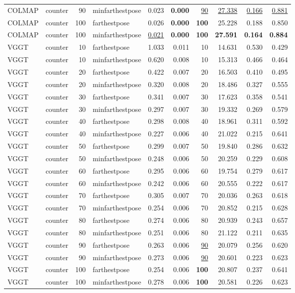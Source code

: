 \begin{table}[H]
\begin{tabular}{llrlrrrrrr}
COLMAP & counter & 90 & minfarthestpose & 0.023 & \textbf{0.000} & \underline{90} & \underline{27.338} & \underline{0.166} & \underline{0.881} \\
COLMAP & counter & 100 & farthestpose & 0.026 & \textbf{0.000} & \textbf{100} & 25.228 & 0.188 & 0.850 \\
COLMAP & counter & 100 & minfarthestpose & \underline{0.021} & \textbf{0.000} & \textbf{100} & \textbf{27.591} & \textbf{0.164} & \textbf{0.884} \\
VGGT & counter & 10 & farthestpose & 1.033 & 0.011 & 10 & 14.631 & 0.530 & 0.429 \\
VGGT & counter & 10 & minfarthestpose & 0.620 & 0.008 & 10 & 15.313 & 0.466 & 0.464 \\
VGGT & counter & 20 & farthestpose & 0.422 & 0.007 & 20 & 16.503 & 0.410 & 0.495 \\
VGGT & counter & 20 & minfarthestpose & 0.320 & 0.008 & 20 & 18.486 & 0.327 & 0.555 \\
VGGT & counter & 30 & farthestpose & 0.341 & 0.007 & 30 & 17.623 & 0.358 & 0.541 \\
VGGT & counter & 30 & minfarthestpose & 0.297 & 0.007 & 30 & 19.332 & 0.269 & 0.579 \\
VGGT & counter & 40 & farthestpose & 0.298 & 0.008 & 40 & 18.961 & 0.311 & 0.592 \\
VGGT & counter & 40 & minfarthestpose & 0.227 & 0.006 & 40 & 21.022 & 0.215 & 0.641 \\
VGGT & counter & 50 & farthestpose & 0.299 & 0.007 & 50 & 19.840 & 0.286 & 0.632 \\
VGGT & counter & 50 & minfarthestpose & 0.248 & 0.006 & 50 & 20.259 & 0.229 & 0.608 \\
VGGT & counter & 60 & farthestpose & 0.295 & 0.006 & 60 & 19.754 & 0.279 & 0.617 \\
VGGT & counter & 60 & minfarthestpose & 0.242 & 0.006 & 60 & 20.555 & 0.222 & 0.617 \\
VGGT & counter & 70 & farthestpose & 0.305 & 0.007 & 70 & 20.036 & 0.263 & 0.618 \\
VGGT & counter & 70 & minfarthestpose & 0.254 & 0.006 & 70 & 20.852 & 0.215 & 0.628 \\
VGGT & counter & 80 & farthestpose & 0.274 & 0.006 & 80 & 20.939 & 0.243 & 0.657 \\
VGGT & counter & 80 & minfarthestpose & 0.251 & 0.006 & 80 & 21.122 & 0.211 & 0.635 \\
VGGT & counter & 90 & farthestpose & 0.263 & 0.006 & \underline{90} & 20.079 & 0.256 & 0.620 \\
VGGT & counter & 90 & minfarthestpose & 0.273 & 0.006 & \underline{90} & 20.601 & 0.223 & 0.623 \\
VGGT & counter & 100 & farthestpose & 0.254 & 0.006 & \textbf{100} & 20.807 & 0.237 & 0.641 \\
VGGT & counter & 100 & minfarthestpose & 0.278 & 0.006 & \textbf{100} & 20.581 & 0.226 & 0.623 \\
\bottomrule
\end{tabular}
\end{table}